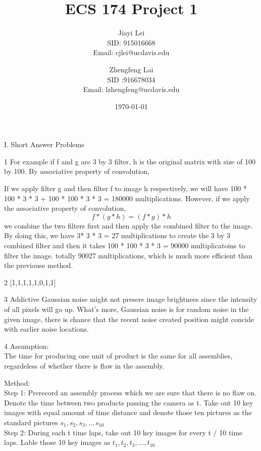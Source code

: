 \documentclass[a4paper,12pt]{article}
\title{ECS 174 Project 1}
\author{
  Jiayi Lei\\
  SID: 915016668\\
  Email: cjlei@ucdavis.edu
  \and
  Zhengfeng Lai\\
  SID :916678034 \\
  Email: lzhengfeng@ucdavis.edu
}
\date{\today}
\begin{document}
\maketitle
\begin{section}{I. Short Answer Problems}
\begin{subsection}{1}
For example if f and g are 3 by 3 filter, h is the original matrix with size of 100 by 100. By associative property of convolution, 


If we apply filter g and then filter f to image h respectively, we will have 100 * 100 * 3 * 3  + 100 * 100 * 3 * 3  = 180000 multiplications. However, if we apply the associative property of convolution, 
$$ f * (g * h) = (f * g) * h $$
we combine the two filters first and then apply the combined filter to the image. By doing this, we have 3* 3 * 3 = 27 multiplications to create the 3 by 3 combined filter and then it takes 100 * 100 * 3 * 3 = 90000 multiplicatoins to filter the image. totally 90027 multiplications, which is much more efficient than the previouse method. 

\end{subsection}

\begin{subsection}{2}
[1,1,1,1,1,0,1,1]

\end{subsection}

\begin{subsection}{3}
Addictive Gaussian noise might not presere image brightnees since the intensity of all pixels will go up. What's more, Gaussian noise is for random noise in the given image, there is chance that the recent noise created position might concide with earlier noise locations.

\end{subsection}

\begin{subsection}{4}
Assumption:\\
The time for producing one unit of product is the same for all assemblies, regardeless of whether there is flaw in the assembly. 

Method:\\
Step 1: Prerecord an assembly process which we are sure that there is no flaw on. Denote the time between two products passing the camera as t. Take out 10 key images with equal amount of time distance and denote those ten pictures as the standard pictures $s_1,s_2, s_3,..,s_10$\\
Step 2: During each t time laps, take out 10 key images for every t / 10 time laps. Lable those 10 key images as $t_1,t_2,t_3,...,t_10$\\


\end{subsection}
\end{section}
\end{document}
